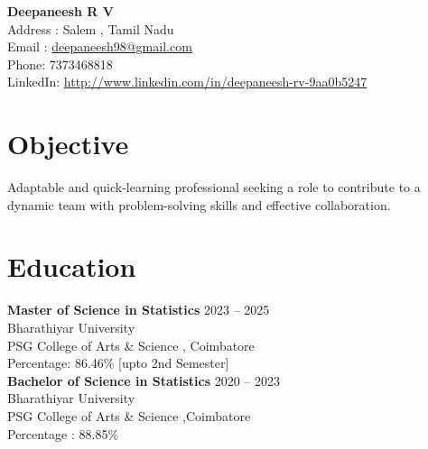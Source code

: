 \documentclass[a4paper,11pt]{article}
\begin{document}
	
	\begin{flushleft}
		{\LARGE \textbf{Deepaneesh R V}} \\
		 Address : Salem , Tamil Nadu \\
		Email : \url{deepaneesh98@gmail.com}\\
		Phone: 7373468818 \\
		LinkedIn: \url{http://www.linkedin.com/in/deepaneesh-rv-9aa0b5247} \\
	\end{flushleft}
	
	\section*{Objective}
	Adaptable and quick-learning professional seeking a role to contribute to a dynamic team with problem-solving skills and effective collaboration.
	
	\section*{Education}
	\noindent
	\textbf{Master of Science in Statistics} \hfill 2023 -- 2025 \\
	Bharathiyar University \\
	PSG College of Arts \& Science , Coimbatore \\
	 Percentage: 86.46\% [upto 2nd Semester] \\[0.1mm]
	
	\textbf{Bachelor of Science in Statistics} \hfill 2020 -- 2023 \\
	Bharathiyar University \\
	PSG College of Arts \& Science ,Coimbatore\\
	Percentage : 88.85\% \\[0.01mm]
	
\end{document}
